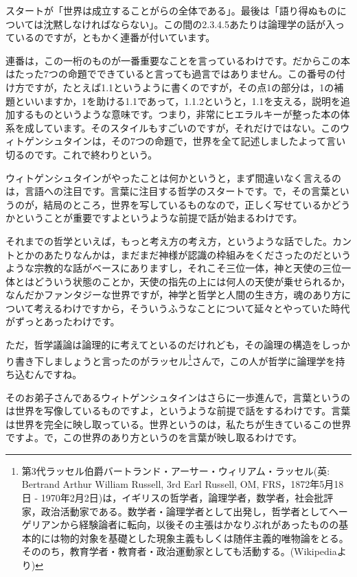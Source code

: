 \documentclass{ltjsbook}
\begin{document}
スタートが「世界は成立することがらの全体である」。最後は「語り得ぬものについては沈黙しなければならない」。この間の2.3.4.5あたりは論理学の話が入っているのですが，ともかく連番が付いています。

連番は，この一桁のものが一番重要なことを言っているわけです。だからこの本はたった7つの命題でできていると言っても過言ではありません。この番号の付け方ですが，たとえば1.1というように書くのですが，その点1の部分は，1の補題といいますか，1を助ける1.1であって，1.1.2というと，1.1を支える，説明を追加するものというような意味です。つまり，非常にヒエラルキーが整った本の体系を成しています。そのスタイルもすごいのですが，それだけではない。このウィトゲンシュタインは，その7つの命題で，世界を全て記述しましたよって言い切るのです。これで終わりという。

ウィトゲンシュタインがやったことは何かというと，まず間違いなく言えるのは，言語への注目です。言葉に注目する哲学のスタートです。で，その言葉というのが，結局のところ，世界を写しているものなので，正しく写せているかどうかということが重要ですよというような前提で話が始まるわけです。

それまでの哲学といえば，もっと考え方の考え方，というような話でした。カントとかのあたりなんかは，まだまだ神様が認識の枠組みをくださったのだというような宗教的な話がベースにありますし，それこそ三位一体，神と天使の三位一体とはどういう状態のことか，天使の指先の上には何人の天使が乗せられるか，なんだかファンタジーな世界ですが，神学と哲学と人間の生き方，魂のあり方について考えるわけですから，そういうふうなことについて延々とやっていた時代がずっとあったわけです。

ただ，哲学議論は論理的に考えてといるのだけれども，その論理の構造をしっかり書き下しましょうと言ったのがラッセル\footnote{第3代ラッセル伯爵バートランド・アーサー・ウィリアム・ラッセル(英: Bertrand Arthur William Russell, 3rd Earl Russell, OM, FRS，1872年5月18日 - 1970年2月2日)は，イギリスの哲学者，論理学者，数学者，社会批評家，政治活動家である。数学者・論理学者として出発し，哲学者としてヘーゲリアンから経験論者に転向，以後その主張はかなりぶれがあったものの基本的には物的対象を基礎とした現象主義もしくは随伴主義的唯物論をとる。そののち，教育学者・教育者・政治運動家としても活動する。(Wikipediaより)}さんで，この人が哲学に論理学を持ち込むんですね。

そのお弟子さんであるウィトゲンシュタインはさらに一歩進んで，言葉というのは世界を写像しているものですよ，というような前提で話をするわけです。言葉は世界を完全に映し取っている。世界というのは，私たちが生きているこの世界ですよ。で，この世界のあり方というのを言葉が映し取るわけです。
\end{document}
